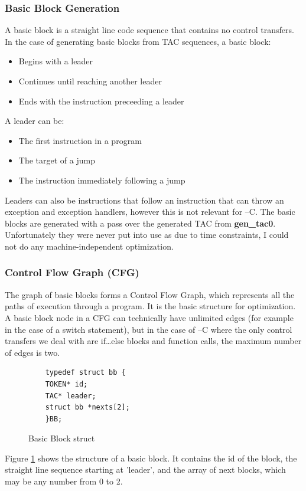 \documentclass[12pt]{article}
\begin{document}
\subsubsection{Basic Block Generation}
A basic block is a straight line code sequence that contains no control transfers\supercite{cooper2011engineering}. In the case of generating basic blocks from TAC sequences, a basic block: 
\begin{itemize}
  \item Begins with a leader
  \item Continues until reaching another leader
  \item Ends with the instruction preceeding a leader
\end{itemize}
A leader can be: 
\begin{itemize}
  \item The first instruction in a program 
  \item The target of a jump
  \item The instruction immediately following a jump 
\end{itemize}
Leaders can also be instructions that follow an instruction that can throw an exception and exception handlers\supercite{aho1986compilers}, however this is not relevant for --C.
The basic blocks are generated with a pass over the generated TAC from \textbf{gen\_tac0}. Unfortunately they were never put into use as due to time constraints, I could not do any machine-independent optimization. 
\subsubsection{Control Flow Graph (CFG)}
The graph of basic blocks forms a Control Flow Graph\supercite{cfg}, which represents all the paths of execution through a program. It is the basic structure for optimization. A basic block node in a CFG can technically have unlimited edges (for example in the case of a switch statement),
but in the case of --C where the only control transfers we deal with are if\dots else blocks and function calls, the maximum number of edges is two. 
\begin{figure}[H]
  \begin{verbatim}
    typedef struct bb {
    TOKEN* id; 
    TAC* leader;
    struct bb *nexts[2];
    }BB;
  \end{verbatim}
  \caption{Basic Block struct}
  \label{bb}
\end{figure}
Figure \ref{bb} shows the structure of a basic block. It contains the id of the block, the straight line sequence starting at 'leader', and the array of next blocks, which may be any number from 0 to 2.
\end{document}
